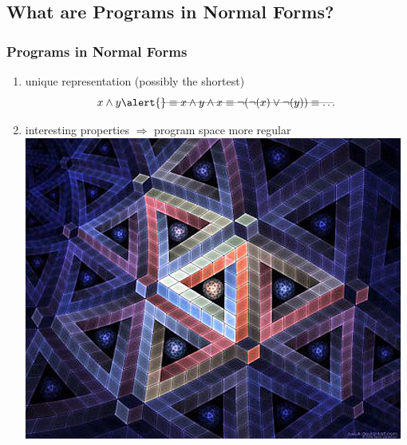 \documentclass{beamer}
\newcommand{\AND}{\land}
\newcommand{\OR}{\lor}
\newcommand{\NOT}{\lnot}
\begin{document}

\subsection{What are Programs in Normal Forms?}

\frame
{

  \frametitle{Programs in Normal Forms}

  \begin{enumerate}
    \item unique representation (possibly the shortest)
      \[x \AND y
      \alert{\rlap{------------------------------------------------}}
      \equiv x \AND y \AND x
      \equiv \NOT(\NOT(x) \OR \NOT(y))
      \equiv \ldots  \]

    \item interesting properties
      $\Rightarrow$ program space more regular
      \includegraphics[scale=0.1]{impossible_space.jpg}
    \end{enumerate}
}
\end{document}
